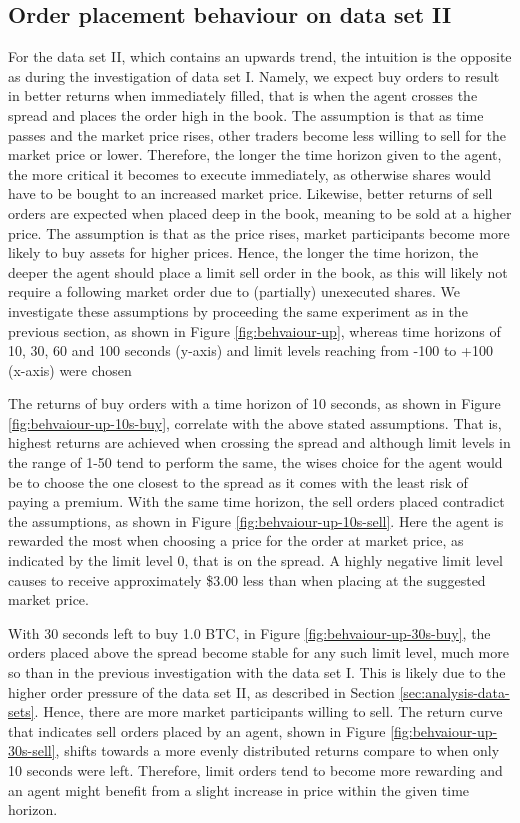 \subsection{Order placement behaviour on data set II}
For the data set II, which contains an upwards trend, the intuition is the opposite as during the investigation of data set I.
Namely, we expect buy orders to result in better returns when immediately filled, that is when the agent crosses the spread and places the order high in the book.
The assumption is that as time passes and the market price rises, other traders become less willing to sell for the market price or lower.
Therefore, the longer the time horizon given to the agent, the more critical it becomes to execute immediately, as otherwise shares would have to be bought to an increased market price.
Likewise, better returns of sell orders are expected when placed deep in the book, meaning to be sold at a higher price.
The assumption is that as the price rises, market participants become more likely to buy assets for higher prices.
Hence, the longer the time horizon, the deeper the agent should place a limit sell order in the book, as this will likely not require a following market order due to (partially) unexecuted shares.
We investigate these assumptions by proceeding the same experiment as in the previous section, as shown in Figure \ref{fig:behvaiour-up}, whereas time horizons of 10, 30, 60 and 100 seconds (y-axis) and limit levels reaching from -100 to +100 (x-axis) were chosen

The returns of buy orders with a time horizon of 10 seconds, as shown in Figure \ref{fig:behvaiour-up-10s-buy}, correlate with the above stated assumptions.
That is, highest returns are achieved when crossing the spread and although limit levels in the range of 1-50 tend to perform the same, the wises choice for the agent would be to choose the one closest to the spread as it comes with the least risk of paying a premium.
With the same time horizon, the sell orders placed contradict the assumptions, as shown in Figure \ref{fig:behvaiour-up-10s-sell}.
Here the agent is rewarded the most when choosing a price for the order at market price, as indicated by the limit level 0, that is on the spread.
A highly negative limit level causes to receive approximately \$3.00 less than when placing at the suggested market price.

With 30 seconds left to buy 1.0 BTC, in Figure \ref{fig:behvaiour-up-30s-buy}, the orders placed above the spread become stable for any such limit level, much more so than in the previous investigation with the data set I.
This is likely due to the higher order pressure of the data set II, as described in Section \ref{sec:analysis-data-sets}.
Hence, there are more market participants willing to sell.
The return curve that indicates sell orders placed by an agent, shown in Figure \ref{fig:behvaiour-up-30s-sell}, shifts towards a more evenly distributed returns compare to when only 10 seconds were left.
Therefore, limit orders tend to become more rewarding and an agent might benefit from a slight increase in price within the given time horizon.

